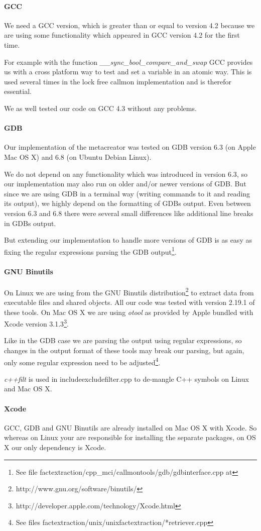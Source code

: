 \paragraph{GCC} We need a GCC version, which is greater than or equal to version 4.2 because we are using some functionality which appeared in GCC version 4.2 for the first time.

For example with the function \emph{\_\_sync\_bool\_compare\_and\_swap} GCC provides us with a cross platform way to test and set a variable in an atomic way. This is used several times in the lock free callmon implementation and is therefor essential.

We as well tested our code on GCC 4.3 without any problems.

\paragraph{GDB}

Our implementation of the metacreator was tested on GDB version 6.3 (on Apple Mac OS X) and 6.8 (on Ubuntu Debian Linux).

We do not depend on any functionality which was introduced in version 6.3, so our implementation may also run on older and/or newer versions of GDB. But since we are using GDB in a terminal way (writing commands to it and reading its output), we highly depend on the formatting of GDBs output. Even between version 6.3 and 6.8 there were several small differences like additional line breaks in GDBs output.

But extending our implementation to handle more versions of GDB is as easy as fixing the regular expressions parsing the GDB output\footnote{See file factextraction/cpp\_mci/callmontools/gdb/gdbinterface.cpp at }.

\paragraph{GNU Binutils}

On Linux we are using  from the GNU Binutils distribution\footnote{http://www.gnu.org/software/binutils/} to extract data from executable files and shared objects.
All our code was tested with version 2.19.1 of these tools.  On Mac OS X we are using \emph{otool} as provided by Apple bundled with Xcode version 3.1.3\footnote{http://developer.apple.com/technology/Xcode.html}.

Like in the GDB case we are parsing the output using regular expressions, so changes in the output format of these tools may break our parsing, but again, only some regular expression need to be adjusted\footnote{See files factextraction/unix/unixfactextraction/*retriever.cpp}.

\emph{c++filt} is used in includeexcludefilter.cpp to de-mangle C++ symbols on Linux and Mac OS X.

\paragraph{Xcode} GCC, GDB and GNU Binutils are already installed on Mac OS X with Xcode.  So whereas on Linux your are responsible for installing the separate packages, on OS X our only dependency is Xcode.
